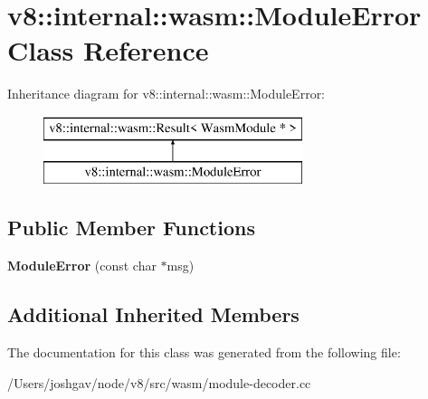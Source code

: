 \hypertarget{classv8_1_1internal_1_1wasm_1_1_module_error}{}\section{v8\+:\+:internal\+:\+:wasm\+:\+:Module\+Error Class Reference}
\label{classv8_1_1internal_1_1wasm_1_1_module_error}
Inheritance diagram for v8\+:\+:internal\+:\+:wasm\+:\+:Module\+Error\+:\begin{figure}[H]
\begin{center}
\leavevmode
\includegraphics[height=2.000000cm]{classv8_1_1internal_1_1wasm_1_1_module_error}
\end{center}
\end{figure}
\subsection*{Public Member Functions}
\begin{DoxyCompactItemize}
\item 
{\bfseries Module\+Error} (const char $\ast$msg)\hypertarget{classv8_1_1internal_1_1wasm_1_1_module_error_acfec2a4a26530b5519f8b07ce1ce1937}{}\label{classv8_1_1internal_1_1wasm_1_1_module_error_acfec2a4a26530b5519f8b07ce1ce1937}

\end{DoxyCompactItemize}
\subsection*{Additional Inherited Members}


The documentation for this class was generated from the following file\+:\begin{DoxyCompactItemize}
\item 
/\+Users/joshgav/node/v8/src/wasm/module-\/decoder.\+cc\end{DoxyCompactItemize}
